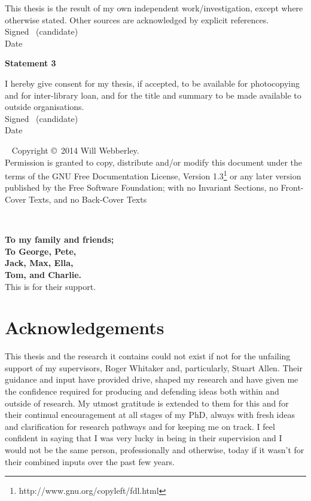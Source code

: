 This thesis is the result of my own independent work/investigation,
except where otherwise stated. Other sources are acknowledged by
explicit references.\\[2ex]
Signed \dotfill \ (candidate) \hspace*{10em}\\[1ex]
Date\ \ \ \ \ \dotfill \hspace*{18em}

\vfill

\textbf{\large Statement 3}

I hereby give consent for my thesis, if accepted, to be available for photocopying and for inter-library loan,
 and for the title and summary to be made available to outside organisations.\\[2ex]
Signed \dotfill \ (candidate) \hspace*{10em}\\[1ex]
Date\ \ \ \ \ \dotfill \hspace*{18em}

\vfill

\cleardoublepage


\thispagestyle{plain}
\ \vfill{\small
Copyright \copyright\ 2014 Will Webberley.\\
Permission is granted to copy, distribute and/or modify this document
under the terms of the GNU Free Documentation License, Version 1.3\footnote{http://www.gnu.org/copyleft/fdl.html} or
any later version published by the Free Software Foundation; with no
Invariant Sections, no Front-Cover Texts, and no Back-Cover Texts}\\[3.5ex]
\cleardoublepage


\ \vspace*{1.11cm}
\begin{flushright}
\textbf{\large To my family and friends;}\\
\textbf{\large To George, Pete,}\\
\textbf{\large Jack, Max, Ella,}\\
\textbf{\large Tom, and Charlie.}\\
\large This is for their support.
\end{flushright}
\newpage
\markboth{}{}
\cleardoublepage

\chapter*{Acknowledgements}
This thesis and the research it contains could not exist if not for the unfailing support of my supervisors, Roger Whitaker and, particularly, Stuart Allen. Their guidance and input have provided drive, shaped my research and have given me the confidence required for producing and defending ideas both within and outside of research. My utmost gratitude is extended to them for this and for their continual encouragement at all stages of my PhD, always with fresh ideas and clarification for research pathways and for keeping me on track. I feel confident in saying that I was very lucky in being in their supervision and I would not be the same person, professionally and otherwise, today if it wasn't for their combined inputs over the past few years.

